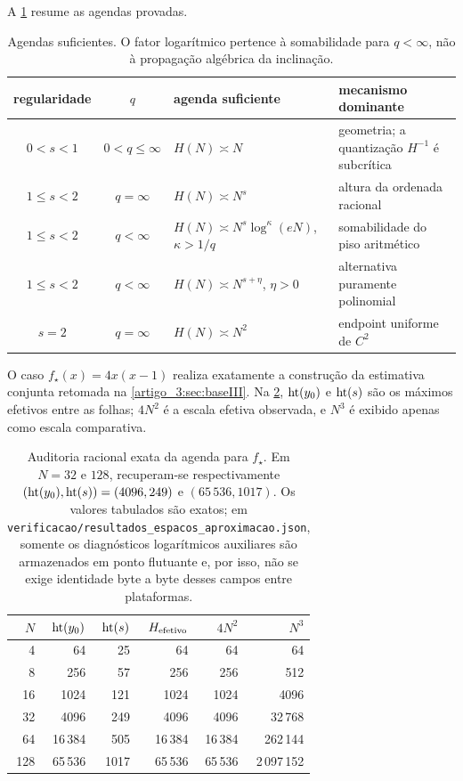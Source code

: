A \cref{artigo_3:tab:height-schedules} resume as agendas provadas.
\begin{table}[t]
 \centering
\caption{Agendas suficientes. O fator logarítmico pertence à
 somabilidade para $q<\infty$, não à propagação algébrica da inclinação.}\label{artigo_3:tab:height-schedules}
\small
 \begin{tabularx}{\linewidth}{@{}cclX@{}}
\toprule
regularidade & $q$ & agenda suficiente & mecanismo dominante\\
\midrule
$0<s<1$ & $0<q\le\infty$ & $H(N)\asymp N$ & geometria; a quantização $H^{-1}$ é subcrítica\\
$1\le s<2$ & $q=\infty$ & $H(N)\asymp N^s$ & altura da ordenada racional\\
$1\le s<2$ & $q<\infty$ & $H(N)\asymp N^s\log^\kappa(eN)$, $\kappa>1/q$ & somabilidade do piso aritmético\\
$1\le s<2$ & $q<\infty$ & $H(N)\asymp N^{s+\eta}$, $\eta>0$ & alternativa puramente polinomial\\
$s=2$ & $q=\infty$ & $H(N)\asymp N^2$ & endpoint uniforme de $C^2$\\
\bottomrule
\end{tabularx}
\end{table}

O caso $f_\star(x)=4x(x-1)$ realiza exatamente a construção da
estimativa conjunta retomada na \cref{artigo_3:sec:baseIII}.
Na \cref{artigo_3:tab:height-audit}, $\operatorname{ht}(y_0)$ e $\operatorname{ht}(s)$ são os
máximos efetivos entre as folhas; $4N^2$ é a escala efetiva observada, e
$N^3$ é exibido apenas como escala comparativa.
\begin{table}[t]
 \centering
\caption{Auditoria racional exata da agenda para $f_\star$. Em $N=32$ e
 $128$, recuperam-se respectivamente
 $(\operatorname{ht}(y_0),\operatorname{ht}(s))=(4096,249)$ e $(65\,536,1017)$. Os valores
 tabulados são exatos; em
 \texttt{verificacao/resultados\_espacos\_aproximacao.json}, somente os diagnósticos
 logarítmicos auxiliares são armazenados em ponto flutuante e, por isso, não
 se exige identidade byte a byte desses campos entre plataformas.}\label{artigo_3:tab:height-audit}
\small
 \begin{tabular}{rrrrrr}
\toprule
$N$ & $\operatorname{ht}(y_0)$ & $\operatorname{ht}(s)$ & $H_{\rm efetivo}$ & $4N^2$ & $N^3$\\
\midrule
4 & 64 & 25 & 64 & 64 & 64\\
8 & 256 & 57 & 256 & 256 & 512\\
16 & 1024 & 121 & 1024 & 1024 & 4096\\
32 & 4096 & 249 & 4096 & 4096 & 32\,768\\
64 & 16\,384 & 505 & 16\,384 & 16\,384 & 262\,144\\
128 & 65\,536 & 1017 & 65\,536 & 65\,536 & 2\,097\,152\\
\bottomrule
\end{tabular}
\end{table}

